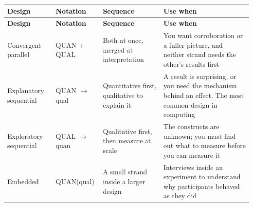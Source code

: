 \begin{center}
\small
\begin{longtable}{@{}L{3.2cm}L{2.3cm}L{4.0cm}L{4.2cm}@{}}
\toprule
\textbf{Design} & \textbf{Notation} & \textbf{Sequence} & \textbf{Use when} \\
\midrule
\endfirsthead
\toprule
\textbf{Design} & \textbf{Notation} & \textbf{Sequence} & \textbf{Use when} \\
\midrule
\endhead
\bottomrule
\endfoot
Convergent parallel
  & QUAN + QUAL
  & Both at once, merged at interpretation
  & You want corroboration or a fuller picture, and neither strand needs the
    other's results first \\
Explanatory sequential
  & QUAN $\rightarrow$ qual
  & Quantitative first, qualitative to explain it
  & A result is surprising, or you need the mechanism behind an effect. The
    most common design in computing \\
Exploratory sequential
  & QUAL $\rightarrow$ quan
  & Qualitative first, then measure at scale
  & The constructs are unknown; you must find out what to measure before you
    can measure it \\
Embedded
  & QUAN(qual)
  & A small strand inside a larger design
  & Interviews inside an experiment to understand why participants behaved as
    they did \\
\end{longtable}
\end{center}

